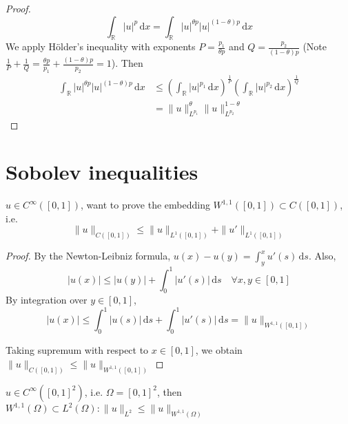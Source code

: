 \documentclass{report}
\begin{document}
\begin{proof}
    \[\int_{\mathbb{R}} \vert u \vert^p \,\mathrm{d}x = \int_{\mathbb{R}} \vert u \vert^{\theta p} \vert u \vert^{(1-\theta) p} \,\mathrm{d}x\]
    We apply Hölder's inequality with exponents \(P = \frac{p_1}{\theta p} \) and \(Q = \frac{p_2}{(1-\theta)p}\) (Note \(\frac{1}{P} + \frac{1}{Q} = \frac{\theta p}{p_1} + \frac{(1-\theta)p}{p_2} = 1\)). Then    
    \begin{align*}
        \int_{\mathbb{R}} \vert u \vert^{\theta p} \vert u \vert^{(1-\theta) p} \,\mathrm{d}x &\leq \left(\int_{\mathbb{R}} \vert u \vert^{p_1} \,\mathrm{d}x \right)^{\frac{1}{P}} \left(\int_{\mathbb{R}} \vert u \vert^{p_2} \,\mathrm{d}x \right)^{\frac{1}{Q}} \\
        &= \|u\|_{L^{p_1}}^{\theta} \|u\|_{L^{p_2}}^{1 - \theta}
    \end{align*}
\end{proof}

\section{Sobolev inequalities}
{
    \(u \in C^{\infty}([0,1])\), want to prove the embedding \(W^{1, 1}([0,1]) \subset C([0,1])\), i.e.
    \begin{equation}\label{eq:3}
        \|u\|_{C([0,1])} \leq \|u\|_{L^{1}([0,1])} + \|u'\|_{L^{1}([0,1])}
    \end{equation}
}

\begin{proof}
    By the Newton-Leibniz formula, \(u(x) - u(y) = \int_{y}^{x} u'(s) \,\mathrm{d}s\). Also,
    \[|u(x)| \leq |u(y)| + \int_{0}^{1} |u'(s)| \,\mathrm{d}s \quad \forall x, y \in [0,1]\]
    By integration over \(y \in [0,1]\), 
    \[|u(x)| \leq \int_{0}^{1} |u(s)| \,\mathrm{d}s + \int_{0}^{1} |u'(s)| \,\mathrm{d}s = \|u\|_{W^{1, 1}([0, 1])}\]

    Taking supremum with respect to \(x \in [0,1]\), we obtain \(\|u\|_{C([0,1])} \leq \|u\|_{W^{1, 1}([0, 1])}\)
\end{proof}

{
    \(u \in C^{\infty}([0,1]^2)\),  i.e. \(\Omega = [0,1]^2\), then \(W^{1, 1}(\Omega) \subset L^{2}(\Omega) : \|u\|_{L^{2}} \leq \|u\|_{W^{1, 1}(\Omega)}\)
}
\end{document}
